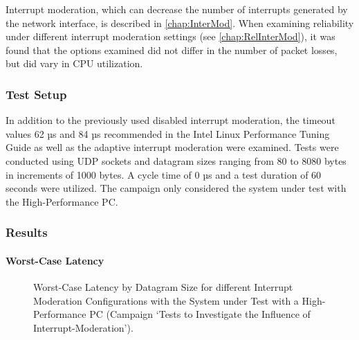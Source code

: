 Interrupt moderation, which can decrease the number of interrupts generated by the network interface, is described in \ref{chap:InterMod}. When examining reliability under different interrupt moderation settings (see \ref{chap:RelInterMod}), it was found that the options examined did not differ in the number of packet losses, but did vary in CPU utilization.

\subsubsection{Test Setup}
In addition to the previously used disabled interrupt moderation, the timeout values 62 µs and 84 µs recommended in the Intel Linux Performance Tuning Guide \cite{intermod03} as well as the adaptive interrupt moderation were examined. Tests were conducted using UDP sockets and datagram sizes ranging from 80 to 8080 bytes in increments of 1000 bytes. A cycle time of 0 µs and a test duration of 60 seconds were utilized. The campaign only considered the system under test with the High-Performance PC.

\subsubsection{Results}
\paragraph{Worst-Case Latency}

\begin{figure}[h!]
  \centering
  \caption{Worst-Case Latency by Datagram Size for different Interrupt Moderation Configurations with the System under Test with a High-Performance PC (Campaign `Tests to Investigate the Influence of Interrupt-Moderation').}
  \label{fig:IMWc}
\end{figure}

